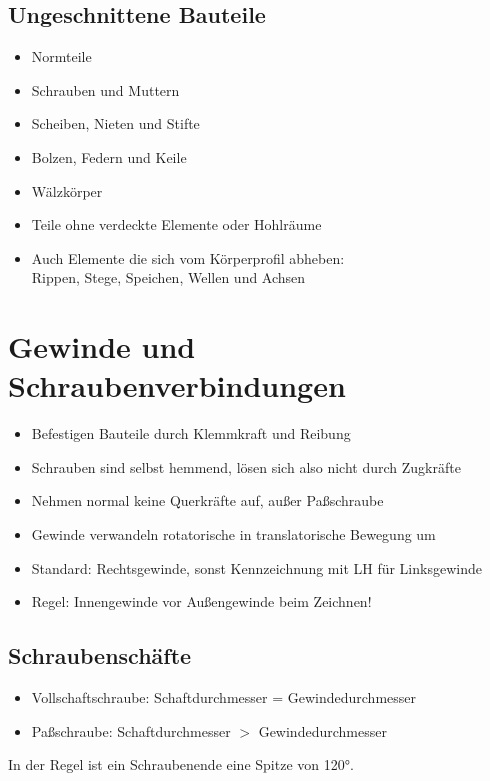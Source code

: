 \documentclass[a4paper,DIV=15,fontsize=11pt]{scrartcl}
\begin{document}
\subsection{Ungeschnittene Bauteile}
\begin{itemize}
	\item Normteile
	\item Schrauben und Muttern
	\item Scheiben, Nieten und Stifte
	\item Bolzen, Federn und Keile
	\item Wälzkörper
	\item Teile ohne verdeckte Elemente oder Hohlräume
	\item Auch Elemente die sich vom Körperprofil abheben:\\
	      Rippen, Stege, Speichen, Wellen und Achsen
\end{itemize}
	
\section{Gewinde und Schraubenverbindungen}
\begin{itemize}
	\item Befestigen Bauteile durch Klemmkraft und Reibung
	\item Schrauben sind selbst hemmend, lösen sich also nicht durch Zugkräfte
	\item Nehmen normal keine Querkräfte auf, außer Paßschraube
	\item Gewinde verwandeln rotatorische in translatorische Bewegung um
	\item Standard: Rechtsgewinde, sonst Kennzeichnung mit LH für Linksgewinde
	\item Regel: Innengewinde vor Außengewinde beim Zeichnen!
\end{itemize}
	
\subsection{Schraubenschäfte}
\begin{itemize}
	\item Vollschaftschraube: Schaftdurchmesser =
	      Gewindedurchmesser  
	\item Paßschraube: Schaftdurchmesser $>$ Gewindedurchmesser 
\end{itemize}

In der Regel ist ein Schraubenende eine Spitze von 120°.
	
\end{document}
